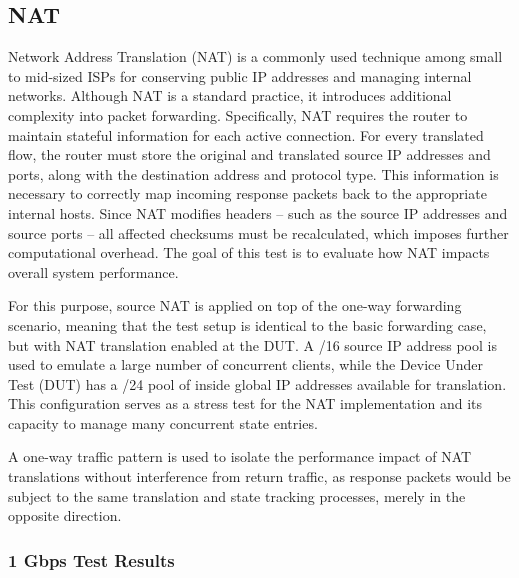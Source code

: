 \subsection{NAT}
Network Address Translation (NAT) is a commonly used technique among small to mid-sized ISPs for conserving public IP addresses and managing internal networks. 
Although NAT is a standard practice, it introduces additional complexity into packet forwarding.
Specifically, NAT requires the router to maintain stateful information for each active connection. 
For every translated flow, the router must store the original and translated source IP addresses and ports, along with the destination address and protocol type. 
This information is necessary to correctly map incoming response packets back to the appropriate internal hosts.
Since NAT modifies headers -- such as the source IP addresses and source ports -- all affected checksums must be recalculated, which imposes further computational overhead.
The goal of this test is to evaluate how NAT impacts overall system performance.

For this purpose, source NAT is applied on top of the one-way forwarding scenario, meaning that the test setup is identical to the basic forwarding case, but with NAT translation enabled at the DUT. 
A /16 source IP address pool is used to emulate a large number of concurrent clients, while the Device Under Test (DUT) has a /24 pool of inside global IP addresses available for translation. 
This configuration serves as a stress test for the NAT implementation and its capacity to manage many concurrent state entries.

A one-way traffic pattern is used to isolate the performance impact of NAT translations without interference from return traffic, 
as response packets would be subject to the same translation and state tracking processes, merely in the opposite direction.


\subsubsection{1 Gbps Test Results}

